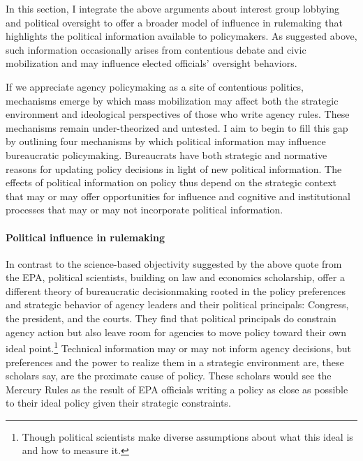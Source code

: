 In this section, I integrate the above arguments about interest group lobbying and political oversight to offer a broader model of influence in rulemaking that highlights the political information available to policymakers. As suggested above, such information occasionally arises from contentious debate and civic mobilization and may influence elected officials' oversight behaviors. %

If we appreciate agency policymaking as a site of contentious politics, mechanisms emerge by which mass mobilization may affect both the strategic environment and ideological perspectives of those who write agency rules. These mechanisms remain under-theorized and untested. I aim to begin to fill this gap by outlining four mechanisms by which political information may influence bureaucratic policymaking. 
Bureaucrats have both strategic and normative reasons for updating policy decisions in light of new political information. The effects of political information on policy thus depend on the strategic context that may or may offer opportunities for influence and cognitive and institutional processes that may or may not incorporate political information.

\paragraph{Political influence in rulemaking}
In contrast to the science-based objectivity suggested by the above quote from the EPA, political scientists, building on law and economics scholarship, offer a different theory of bureaucratic decisionmaking rooted in the policy preferences and strategic behavior of agency leaders and their political principals: Congress, the president, and the courts. They find that political principals do constrain agency action but also leave room for agencies to move policy toward their own ideal point.\footnote{Though political scientists make diverse assumptions about what this ideal is and how to measure it.} Technical information may or may not inform agency decisions, but preferences and the power to realize them in a strategic environment are, these scholars say, are the proximate cause of policy. These scholars would see the Mercury Rules as the result of EPA officials writing a policy as close as possible to their ideal policy given their strategic constraints.

